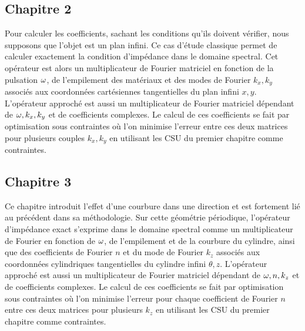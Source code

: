 \subsection*{Chapitre 2}
Pour calculer les coefficients, sachant les conditions qu'ils doivent vérifier, nous supposons que l'objet est un plan infini. Ce cas d'étude classique permet de calculer exactement la condition d’impédance dans le domaine spectral. 
Cet opérateur est alors un multiplicateur de Fourier matriciel en fonction de la pulsation \(\omega\), de l'empilement des matériaux et des modes de Fourier \(k_x,k_y\) associés aux coordonnées cartésiennes tangentielles du plan infini \(x,y\).
L'opérateur approché est aussi un multiplicateur de Fourier matriciel dépendant de \(\omega, k_x, k_y\) et de coefficients complexes.
Le calcul de ces coefficients se fait par optimisation sous contraintes où l'on minimise l'erreur entre ces deux matrices pour plusieurs couples \(k_x,k_y\) en utilisant les CSU du premier chapitre comme contraintes.

\subsection*{Chapitre 3}
Ce chapitre introduit l'effet d'une courbure dans une direction et est fortement lié au précédent dans sa méthodologie.
Sur cette géométrie périodique, l'opérateur d'impédance exact s'exprime dans le domaine spectral comme un multiplicateur de Fourier en fonction de \(\omega\), de l'empilement et de la courbure du cylindre, ainsi que des coefficients de Fourier \(n\) et du mode de Fourier \(k_z\) associés aux coordonnées cylindriques tangentielles du cylindre infini \(\theta,z\).
L'opérateur approché est aussi un multiplicateur de Fourier matriciel dépendant de \(\omega, n, k_z\) et de coefficients complexes.
Le calcul de ces coefficients se fait par optimisation sous contraintes où l'on minimise l'erreur pour chaque coefficient de Fourier \(n\) entre ces deux matrices pour plusieurs \(k_z\) en utilisant les CSU du premier chapitre comme contraintes.

